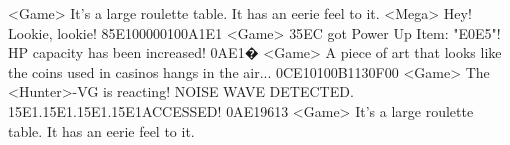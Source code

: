 <Game> It's a large roulette table. It has an eerie feel to it. 
<Mega> Hey! Lookie, lookie! 
{85}{E1}{00}{00}{01}{00}{A1}{E1} 
<Game> {35}{EC} got Power Up Item: "{E0}{E5}"! 
HP capacity has been increased! 
{0A}{E1}�
<Game> A piece of art that looks like the coins used in casinos hangs in the air... 
{0C}{E1}{01}{00}{B1}{13}{0F}{00}
<Game> The <Hunter>-VG is reacting! 
NOISE WAVE DETECTED. {15}{E1}.{15}{E1}.{15}{E1}.{15}{E1}ACCESSED! 
{0A}{E1}{96}{13}
<Game> It's a large roulette table. It has an eerie feel to it. 

